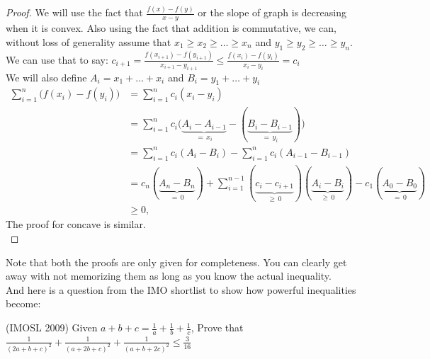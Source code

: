 \begin{proof}
We will use the fact that $\frac{f(x)-f(y)}{x-y}$ or the slope of graph is decreasing when it is convex. Also using the fact that addition is commutative, we can, without loss of generality assume that $x_1\geq x_2 \geq \dots \geq x_n$ and $y_1\geq y_2 \geq \dots \geq y_n$.\\
We can use that to say: $c_{i+1}=\frac{f(x_{i+1})-f(y_{i+1})}{x_{i+1}-y_{i+1}} \leq \frac{f(x_{i})-f(y_{i})}{x_{i}-y_{i}}=c_i$\\
We will also define $A_i=x_1+\dots+x_i$ and $B_i=y_1+\dots+y_i$
\[\begin{aligned}\sum _{i=1}^{n}{\bigl (}f(x_{i})-f(y_{i}){\bigr )}&=\sum _{i=1}^{n}c_{i}(x_{i}-y_{i})\\&=\sum _{i=1}^{n}c_{i}{\bigl (}\underbrace {A_{i}-A_{i-1}} _{=\,x_{i}}{}-(\underbrace {B_{i}-B_{i-1}} _{=\,y_{i}}){\bigr )}\\&=\sum _{i=1}^{n}c_{i}(A_{i}-B_{i})-\sum _{i=1}^{n}c_{i}(A_{i-1}-B_{i-1})\\&=c_{n}(\underbrace {A_{n}-B_{n}} _{=\,0})+\sum _{i=1}^{n-1}(\underbrace {c_{i}-c_{i+1}} _{\geq \,0})(\underbrace {A_{i}-B_{i}} _{\geq \,0})-c_{1}(\underbrace {A_{0}-B_{0}} _{=\,0})\\&\geq 0,\end{aligned}\]
The proof for concave is similar.\\
\end{proof}
Note that both the proofs are only given for completeness. You can clearly get away with not memorizing them as long as you know the actual inequality.\\
And here is a question from the IMO shortlist to show how powerful inequalities become:\\
\begin{example}
    (IMOSL 2009)  
Given $a + b + c = \frac{1}{a}+\frac{1}{b}+\frac{1}{c}$, Prove that $\frac{1}{(2a+b+c)^2}+\frac{1}{(a+2b+c)^2}+\frac{1}{(a+b+2c)^2} \leq \frac{3}{16}$
\end{example}
